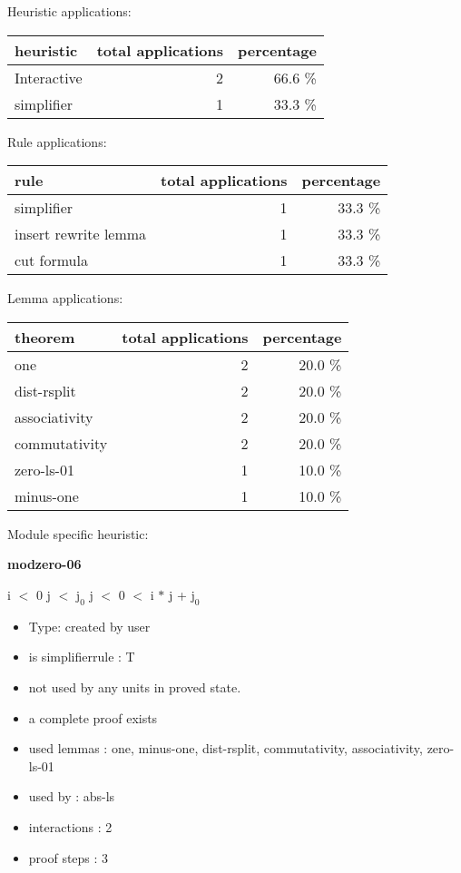\documentclass[a4paper]{article}
\begin{document}
\medskip


Heuristic applications:

\begin{supertabular}{l|r|r}
heuristic	& total applications & percentage \\ \hline
Interactive & 2 & 66.6 \% \\
simplifier & 1 & 33.3 \% \\

\end{supertabular}

Rule applications:

\begin{supertabular}{l|r|r}
rule	        & total applications & percentage \\ \hline
simplifier & 1 & 33.3 \% \\
insert rewrite lemma & 1 & 33.3 \% \\
cut formula & 1 & 33.3 \% \\

\end{supertabular}

Lemma applications:

\begin{supertabular}{l|r|r}
theorem	        & total applications & percentage \\ \hline
one & 2 & 20.0 \% \\
dist-rsplit & 2 & 20.0 \% \\
associativity & 2 & 20.0 \% \\
commutativity & 2 & 20.0 \% \\
zero-ls-01 & 1 & 10.0 \% \\
minus-one & 1 & 10.0 \% \\

\end{supertabular}

Module specific heuristic:

\pagebreak

{\LARGE\bf modzero-06}\label{lemma-modzero-06}

\medskip

 \Fol i $<$ 0 \And j $<$ $\mbox{j}_{0}$ \And j $<$ 0  $<$ i $*$ j + $\mbox{j}_{0}$

\begin{itemize}

\item Type: created by user

\item is simplifierrule : T
\item not used by any units in proved state.
\item       a complete proof exists
\item       used lemmas  : one, minus-one, dist-rsplit, commutativity, associativity, zero-ls-01
\item       used by      : abs-ls
\item       interactions : 2
\item       proof steps  : 3
\end{itemize}
\end{document}

